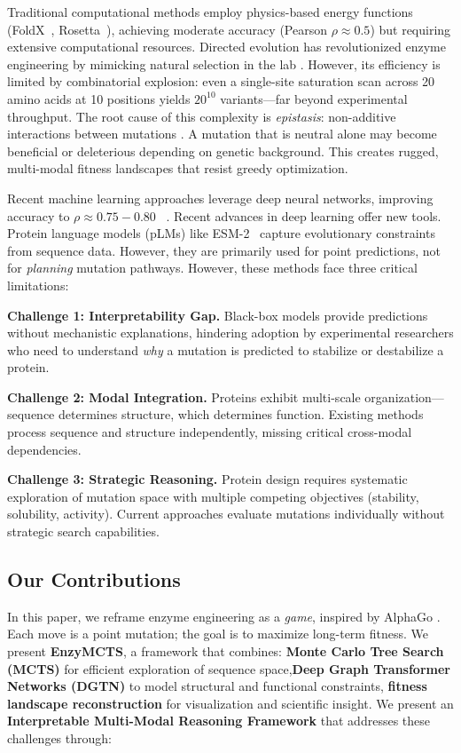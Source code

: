 \documentclass[11pt]{article}
\begin{document}
Traditional computational methods employ physics-based energy functions
(FoldX~\cite{schymkowitz2005foldx}, Rosetta~\cite{kellogg2011role}), achieving
moderate accuracy (Pearson $\rho \approx 0.5$) but requiring extensive
computational resources.  Directed evolution has revolutionized enzyme
engineering by mimicking natural selection in the lab \cite{arnold1998design}.
However, its efficiency is limited by combinatorial explosion: even a
single-site saturation scan across 20 amino acids at 10 positions yields
$20^{10}$ variants—far beyond experimental throughput.
%
The root cause of this complexity is \textit{epistasis}: non-additive
interactions between mutations \cite{weinreich2006perspective}. A mutation that
is neutral alone may become beneficial or deleterious depending on genetic
background. This creates rugged, multi-modal fitness landscapes that resist
greedy optimization.

Recent machine learning approaches leverage deep neural networks, improving
accuracy to $\rho \approx 0.75-0.80$ ~\cite{meier2021language,cao2019deepddg}.
Recent advances in deep learning offer new tools. Protein language models
(pLMs) like ESM-2~\cite{lin2022evolutionary} capture evolutionary constraints
from sequence data. However, they are primarily used for point predictions, not
for \textit{planning} mutation pathways.  However, these methods face three
critical limitations:

\textbf{Challenge 1: Interpretability Gap.} Black-box models provide
predictions without mechanistic explanations, hindering adoption by
experimental researchers who need to understand \textit{why} a mutation is
predicted to stabilize or destabilize a protein.

\textbf{Challenge 2: Modal Integration.} Proteins exhibit multi-scale
organization—sequence determines structure, which determines function. Existing
methods process sequence and structure independently, missing critical
cross-modal dependencies.

\textbf{Challenge 3: Strategic Reasoning.} Protein design requires systematic
exploration of mutation space with multiple competing objectives (stability,
solubility, activity). Current approaches evaluate mutations individually
without strategic search capabilities.

\subsection*{Our Contributions}

In this paper, we reframe enzyme engineering as a \textit{game}, inspired by
AlphaGo \cite{silver2016mastering}. Each move is a point mutation; the goal is
to maximize long-term fitness. We present \textbf{EnzyMCTS}, a framework that
combines: \textbf{Monte Carlo Tree Search (MCTS)} for efficient
exploration of sequence space,\textbf{Deep Graph Transformer Networks
(DGTN)} to model structural and functional constraints, \textbf{fitness
landscape reconstruction} for visualization and scientific insight.  We present
an \textbf{Interpretable Multi-Modal Reasoning Framework} that addresses these
challenges through:
\end{document}
